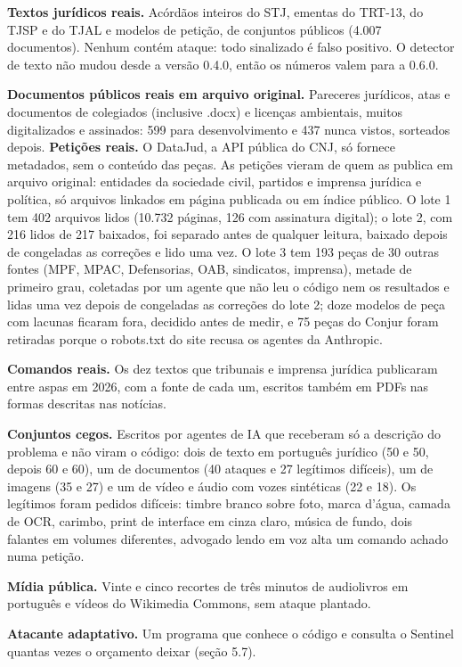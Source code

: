 \documentclass[
  brazilian,
  11pt,
]{article}
\begin{document}
\textbf{Textos jurídicos reais.} Acórdãos inteiros do STJ, ementas do
TRT-13, do TJSP e do TJAL e modelos de petição, de conjuntos públicos
(4.007 documentos). Nenhum contém ataque: todo sinalizado é falso
positivo. O detector de texto não mudou desde a versão 0.4.0, então os
números valem para a 0.6.0.

\textbf{Documentos públicos reais em arquivo original.} Pareceres
jurídicos, atas e documentos de colegiados (inclusive .docx) e licenças
ambientais, muitos digitalizados e assinados: 599 para desenvolvimento e
437 nunca vistos, sorteados depois. \textbf{Petições reais.} O DataJud,
a API pública do CNJ, só fornece metadados, sem o conteúdo das peças. As
petições vieram de quem as publica em arquivo original: entidades da
sociedade civil, partidos e imprensa jurídica e política, só arquivos
linkados em página publicada ou em índice público. O lote 1 tem 402
arquivos lidos (10.732 páginas, 126 com assinatura digital); o lote 2,
com 216 lidos de 217 baixados, foi separado antes de qualquer leitura,
baixado depois de congeladas as correções e lido uma vez. O lote 3 tem
193 peças de 30 outras fontes (MPF, MPAC, Defensorias, OAB, sindicatos,
imprensa), metade de primeiro grau, coletadas por um agente que não leu
o código nem os resultados e lidas uma vez depois de congeladas as
correções do lote 2; doze modelos de peça com lacunas ficaram fora,
decidido antes de medir, e 75 peças do Conjur foram retiradas porque o
robots.txt do site recusa os agentes da Anthropic.

\textbf{Comandos reais.} Os dez textos que tribunais e imprensa jurídica
publicaram entre aspas em 2026, com a fonte de cada um, escritos também
em PDFs nas formas descritas nas notícias.

\textbf{Conjuntos cegos.} Escritos por agentes de IA que receberam só a
descrição do problema e não viram o código: dois de texto em português
jurídico (50 e 50, depois 60 e 60), um de documentos (40 ataques e 27
legítimos difíceis), um de imagens (35 e 27) e um de vídeo e áudio com
vozes sintéticas (22 e 18). Os legítimos foram pedidos difíceis: timbre
branco sobre foto, marca d'água, camada de OCR, carimbo, print de
interface em cinza claro, música de fundo, dois falantes em volumes
diferentes, advogado lendo em voz alta um comando achado numa petição.

\textbf{Mídia pública.} Vinte e cinco recortes de três minutos de
audiolivros em português e vídeos do Wikimedia Commons, sem ataque
plantado.

\textbf{Atacante adaptativo.} Um programa que conhece o código e
consulta o Sentinel quantas vezes o orçamento deixar (seção 5.7).
\end{document}
